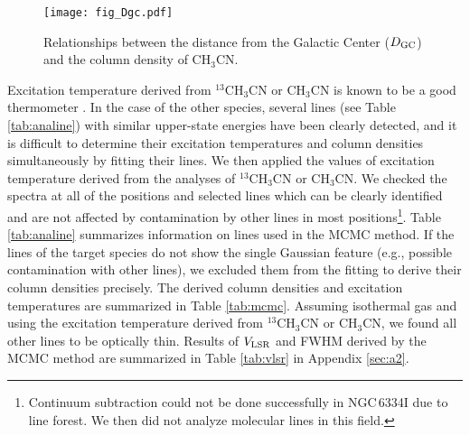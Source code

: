 \documentclass[twocolumn, twocolappendix]{aastex631}
\begin{document}
\begin{figure}[!th]
 \begin{center}
  \texttt{[image: fig\_Dgc.pdf]}
 \end{center}
\caption{Relationships between the distance from the Galactic Center ($D_{\rm {GC}}$) and the column density of CH$_{3}$CN. \label{fig:Dgc}}
\end{figure}

Excitation temperature derived from $^{13}$CH$_{3}$CN or CH$_{3}$CN is known to be a good thermometer \citep[e.g.,][]{2014ApJ...786...38H, 2014ApJ...788..187H}.
In the case of the other species, several lines (see Table \ref{tab:analine}) with similar upper-state energies have been clearly detected, and it is difficult to determine their excitation temperatures and column densities simultaneously by fitting their lines.
We then applied the values of excitation temperature derived from the analyses of $^{13}$CH$_{3}$CN or CH$_{3}$CN.
We checked the spectra at all of the positions and selected lines which can be clearly identified and are not affected by contamination by other lines in most positions\footnote{Continuum subtraction could not be done successfully in NGC\,6334I due to line forest. We then did not analyze molecular lines in this field.}.
Table \ref{tab:analine} summarizes information on lines used in the MCMC method.
If the lines of the target species do not show the single Gaussian feature (e.g., possible contamination with other lines), we excluded them from the fitting to derive their column densities precisely.
The derived column densities and excitation temperatures are summarized in Table \ref{tab:mcmc}.
Assuming isothermal gas and using the excitation temperature derived from $^{13}$CH$_{3}$CN or CH$_{3}$CN, we found all other lines to be optically thin.
Results of $V_{\rm {LSR}}$ and FWHM derived by the MCMC method are summarized in Table \ref{tab:vlsr} in Appendix \ref{sec:a2}.
\end{document}
